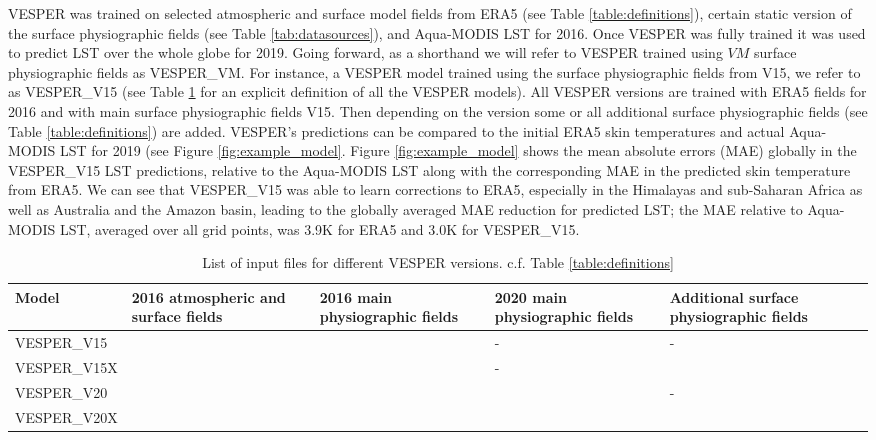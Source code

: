 \documentclass[hess, twostagejnl]{copernicus}
\begin{document}
 \noindent VESPER was trained on selected atmospheric and surface model fields from ERA5 (see Table \ref{table:definitions}), certain static version of the surface physiographic fields (see Table \ref{tab:datasources}), and Aqua-MODIS LST for 2016. Once VESPER was fully trained it was used to predict LST over the whole globe for 2019.  Going forward, as a shorthand we will refer to VESPER trained using $VM$ surface physiographic fields as VESPER\_VM. For instance, a VESPER model trained using the surface physiographic fields from V15, we refer to as VESPER\_V15 (see Table \ref{tab:vesper_table} for an explicit definition of all the VESPER models). All VESPER versions are trained with ERA5 fields for 2016 and with main surface physiographic fields V15. Then depending on the version some or all additional surface physiographic fields (see Table \ref{table:definitions}) are added. VESPER’s predictions can be compared to the initial ERA5 skin temperatures and actual Aqua-MODIS LST for 2019 (see Figure \ref{fig:example_model}. Figure \ref{fig:example_model} shows the mean absolute errors (MAE) globally in the VESPER\_V15 LST predictions, relative to the Aqua-MODIS LST along with the corresponding MAE in the predicted skin temperature from ERA5. We can see that VESPER\_V15 was able to learn corrections to ERA5, especially in the Himalayas and sub-Saharan Africa as well as Australia and the Amazon basin, leading to the globally averaged MAE reduction for predicted LST; the MAE relative to  Aqua-MODIS LST, averaged over all grid points, was 3.9K for ERA5 and 3.0K for VESPER\_V15. \newline 
  
 \begin{table}
 	\begin{tabularx}{\textwidth}{lXXXX}
 		\toprule
 		Model & 2016 atmospheric and surface fields & 2016 main physiographic fields & 2020 main physiographic fields & Additional surface physiographic fields \\
 		\hline
 		VESPER\_V15 & \checkmark & \checkmark & - & - \\
 		VESPER\_V15X & \checkmark & \checkmark & - & \checkmark \\
 		VESPER\_V20 & \checkmark & \checkmark & \checkmark & - \\
 		VESPER\_V20X & \checkmark & \checkmark & \checkmark & \checkmark \\
 		
 		\bottomrule
 	\end{tabularx}
 	\caption{List of input files for different VESPER versions. c.f. Table \ref{table:definitions}}
 	\label{tab:vesper_table}
 \end{table}
 
\end{document}
